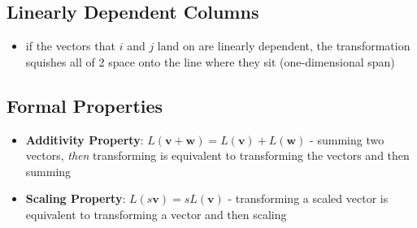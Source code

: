 \subsection{Linearly Dependent Columns}
\begin{itemize}
    \item if the vectors that $i$ and $j$ land on are linearly dependent, the transformation squishes all of 2 space onto the line where they sit (one-dimensional span) 
\end{itemize}

\subsection{Formal Properties}
\begin{itemize}
    \item \textbf{Additivity Property}: $L(\mathbf{v} + \mathbf{w}) = L(\mathbf{v}) + L(\mathbf{w})$ - summing two vectors, \textit{then} transforming is equivalent to transforming the vectors and then summing
    \item \textbf{Scaling Property}: $L(s \mathbf{v}) = s L(\mathbf{v})$ - transforming a scaled vector is equivalent to transforming a vector and then scaling
\end{itemize}